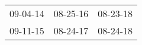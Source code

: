 \begin{supertabular}{p{0.33\columnwidth}p{0.33\columnwidth}p{0.33\columnwidth}}
 09-04-14\textsuperscript{} &  08-25-16\textsuperscript{} &  08-23-18\textsuperscript{} \\
 09-11-15\textsuperscript{} &  08-24-17\textsuperscript{} &  08-24-18\textsuperscript{} \\
\end{supertabular}
